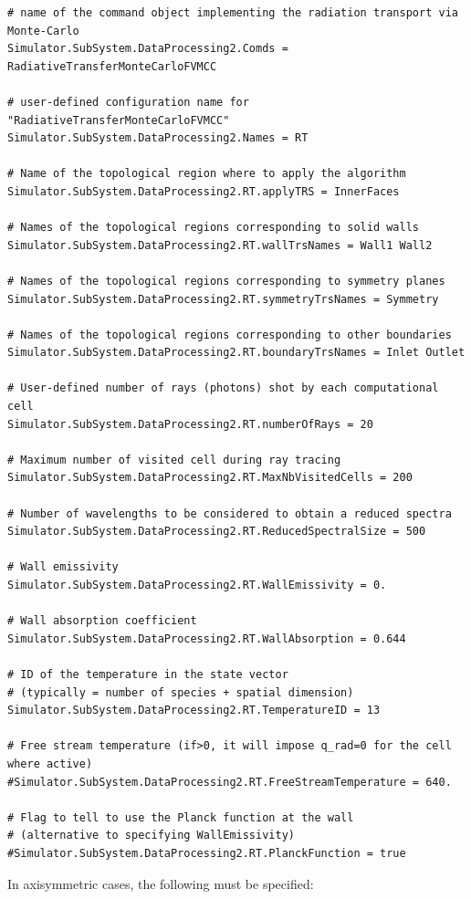 \documentclass[11pt]{article}
\begin{document}
\begin{lstlisting}[breaklines]
# name of the command object implementing the radiation transport via Monte-Carlo
Simulator.SubSystem.DataProcessing2.Comds = RadiativeTransferMonteCarloFVMCC

# user-defined configuration name for "RadiativeTransferMonteCarloFVMCC"
Simulator.SubSystem.DataProcessing2.Names = RT

# Name of the topological region where to apply the algorithm
Simulator.SubSystem.DataProcessing2.RT.applyTRS = InnerFaces

# Names of the topological regions corresponding to solid walls
Simulator.SubSystem.DataProcessing2.RT.wallTrsNames = Wall1 Wall2

# Names of the topological regions corresponding to symmetry planes
Simulator.SubSystem.DataProcessing2.RT.symmetryTrsNames = Symmetry

# Names of the topological regions corresponding to other boundaries
Simulator.SubSystem.DataProcessing2.RT.boundaryTrsNames = Inlet Outlet

# User-defined number of rays (photons) shot by each computational cell 
Simulator.SubSystem.DataProcessing2.RT.numberOfRays = 20

# Maximum number of visited cell during ray tracing
Simulator.SubSystem.DataProcessing2.RT.MaxNbVisitedCells = 200

# Number of wavelengths to be considered to obtain a reduced spectra 
Simulator.SubSystem.DataProcessing2.RT.ReducedSpectralSize = 500

# Wall emissivity 
Simulator.SubSystem.DataProcessing2.RT.WallEmissivity = 0.

# Wall absorption coefficient 
Simulator.SubSystem.DataProcessing2.RT.WallAbsorption = 0.644

# ID of the temperature in the state vector 
# (typically = number of species + spatial dimension)
Simulator.SubSystem.DataProcessing2.RT.TemperatureID = 13

# Free stream temperature (if>0, it will impose q_rad=0 for the cell where active)
#Simulator.SubSystem.DataProcessing2.RT.FreeStreamTemperature = 640.

# Flag to tell to use the Planck function at the wall 
# (alternative to specifying WallEmissivity)
#Simulator.SubSystem.DataProcessing2.RT.PlanckFunction = true
\end{lstlisting}

In axisymmetric cases, the following must be specified:
 
\end{document}
